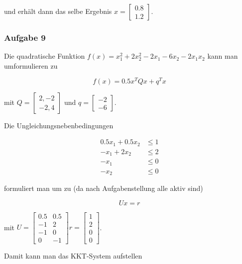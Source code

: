 \documentclass[a4paper, 12pt]{report}
\begin{document}
und erhält dann das selbe Ergebnis $x = \begin{bmatrix}0.8\\1.2\end{bmatrix}$.

\subsubsection{Aufgabe 9}
Die quadratische Funktion $f(x) = x_1^2 + 2x_2^2 - 2x_1 - 6x_2 - 2x_1x_2$ kann man umformulieren zu

$$ f(x) = 0.5x^TQx + q^Tx $$

mit $Q = \begin{bmatrix}2, -2\\-2, 4\end{bmatrix}$ und $q = \begin{bmatrix}-2\\-6\end{bmatrix}$.

Die Ungleichungsnebenbedingungen

\begin{align*} 
  0.5x_1 + 0.5x_2 &\leq 1\\
  -x_1 + 2x_2 &\leq 2\\
  -x_1 &\leq 0\\
  -x_2 &\leq 0
\end{align*}

formuliert man um zu (da nach Aufgabenstellung alle aktiv sind)

$$ Ux = r$$

mit $ U = \begin{bmatrix} 0.5 & 0.5\\-1 & 2\\-1 & 0\\0 & -1 \end{bmatrix} r = \begin{bmatrix}1\\2\\0\\0\end{bmatrix} $.

Damit kann man das KKT-System aufstellen
\end{document}
